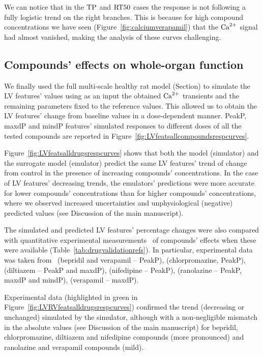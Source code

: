 \vspace{0.2cm}\noindent
We can notice that in the $\textrm{TP}$ and $\textrm{RT50}$ cases the response is not following a fully logistic trend on the right branches. This is because for high compound concentrations we have seen (Figure~\ref{fig:calciumverapamil}) that the $\textrm{Ca}^{2+}$ signal had almost vanished, making the analysis of these curves challenging.


%
%
%
\subsection{Compounds' effects on whole-organ function}\label{sec:ch6compounds_effects_on_the_whole_organ_function}
We finally used the full multi-scale healthy rat model (Section) to simulate the LV features' values using as an input the obtained $\textrm{Ca}^{2+}$ transients and the remaining parameters fixed to the reference values. This allowed us to obtain the LV features' change from baseline values in a dose-dependent manner. PeakP, maxdP and mindP features' simulated responses to different doses of all the tested compounds are reported in Figure~\ref{fig:LVfeatsallcompoundsrespcurves}.

\vspace{0.2cm}
Figure~\ref{fig:LVfeatsalldrugsrespcurves} shows that both the model (simulator) and the surrogate model (emulator) predict the same LV features' trend of change from control in the presence of increasing compounds' concentrations. In the case of LV features' decreasing trends, the emulators' predictions were more accurate for lower compounds' concentrations than for higher compounds' concentrations, where we observed increased uncertainties and unphysiological (negative) predicted values (see Discussion of the main manuscript).

\vspace{0.2cm}\noindent
The simulated and predicted LV features' percentage changes were also compared with quantitative experimental measurements~\cite{Amsterdam:1988,Langslet:1971,Koltai:1989,Saponara:2007,Wang:2007,Kolar:1990} of compounds' effects when these were available (Table~\ref{tab:drugvalidationrefs}). In particular, experimental data was taken from~\cite{Amsterdam:1988} (bepridil and verapamil -- PeakP), \cite{Langslet:1971} (chlorpromazine, PeakP), \cite{Koltai:1989} (diltiazem -- PeakP and maxdP), \cite{Saponara:2007} (nifedipine -- PeakP), \cite{Wang:2007} (ranolazine -- PeakP, maxdP and mindP), \cite{Kolar:1990} (verapamil -- maxdP).

\vspace{0.2cm}
Experimental data (highlighted in green in Figure~\ref{fig:LVRVfeatsalldrugsrespcurves}) confirmed the trend (decreasing or unchanged) simulated by the simulator, although with a non-negligible mismatch in the absolute values (see Discussion of the main manuscript) for bepridil, chlorpromazine, diltiazem and nifedipine compounds (more pronounced) and ranolazine and verapamil compounds (mild).


